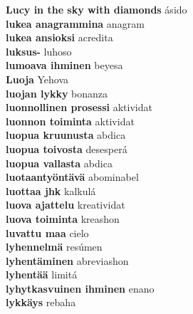 \textbf{ Lucy in the sky with diamonds  } ásido \\
\textbf{ lukea anagrammina  } anagram \\
\textbf{ lukea ansioksi  } acredita \\
\textbf{ luksus-  } luhoso \\
\textbf{ lumoava ihminen  } beyesa \\
\textbf{ Luoja  } Yehova \\
\textbf{ luojan lykky  } bonanza \\
\textbf{ luonnollinen prosessi  } aktividat \\
\textbf{ luonnon toiminta  } aktividat \\
\textbf{ luopua kruunusta  } abdica \\
\textbf{ luopua toivosta  } desesperá \\
\textbf{ luopua vallasta  } abdica \\
\textbf{ luotaantyöntävä  } abominabel \\
\textbf{ luottaa jhk  } kalkulá \\
\textbf{ luova ajattelu  } kreatividat \\
\textbf{ luova toiminta  } kreashon \\
\textbf{ luvattu maa  } cielo \\
\textbf{ lyhennelmä  } resúmen \\
\textbf{ lyhentäminen  } abreviashon \\
\textbf{ lyhentää  } limitá \\
\textbf{ lyhytkasvuinen ihminen  } enano \\
\textbf{ lykkäys  } rebaha \\
